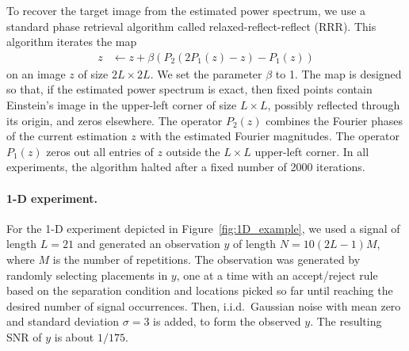 \documentclass[9pt,twocolumn,twoside,lineno]{pnas-new}
\begin{document}
To recover the target image from the estimated power spectrum, we use a standard phase retrieval algorithm called relaxed-reflect-reflect (RRR). This algorithm iterates the map
\begin{align*}
z & \leftarrow z + \beta (P_2(2P_1(z) - z) - P_1(z))
\end{align*}
on an image $z$ of size $2L\times 2L$.
We set the parameter $\beta$ to 1.
The map is designed so that, if the estimated power spectrum is exact, then fixed points contain Einstein's image in the upper-left corner of size $L \times L$, possibly reflected through its origin, and zeros elsewhere. The operator $P_2(z)$ combines the Fourier phases of  the current estimation $z$ with the estimated Fourier magnitudes. The operator $P_1(z)$ zeros out all entries of $z$ outside the $L\times L$ upper-left corner. In all experiments, the algorithm halted after a fixed number of 2000 iterations.
%




\paragraph{1-D experiment.}
For the 1-D experiment depicted in Figure~\ref{fig:1D_example}, we used a signal of length $L=21$ and generated an observation $y$ of length $N = 10(2L-1)M$, where $M$ is the number of repetitions. 
The observation was generated by randomly selecting placements in $y$, one at a time with an accept/reject rule based on the separation condition and locations picked so far until reaching the desired number of signal occurrences. Then, i.i.d.\ Gaussian noise with mean zero and standard deviation $\sigma = 3$ is added, to form the observed $y$. The resulting SNR of $y$ is about $1/175$.
\end{document}
